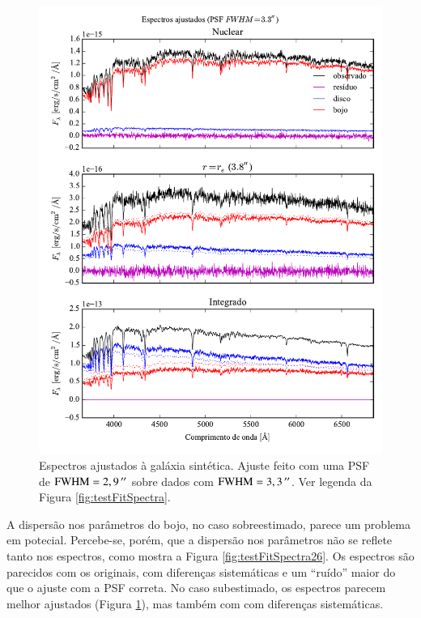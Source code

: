 \begin{figure}
	\includegraphics{figuras/simulation_spectra_psf33}
	\caption[Espectros ajustados (teste com PSF $\mathrm{FWHM} = 3,3\,\arcs$).]
	{Espectros ajustados à galáxia sintética. Ajuste feito com uma PSF de
	$\mathrm{FWHM} = 2,9\,^{\prime\prime}$ sobre dados com $\mathrm{FWHM} = 3,3\,\arcs$. Ver
	legenda da Figura \ref{fig:testFitSpectra}.} \label{fig:testFitSpectra33}
\end{figure}

A dispersão nos parâmetros do bojo, no caso sobreestimado, parece um problema em
potecial. Percebe-se, porém, que a dispersão nos parâmetros não se reflete tanto
nos espectros, como mostra a Figura \ref{fig:testFitSpectra26}. Os espectros são
parecidos com os originais, com diferenças sistemáticas e um ``ruído'' maior do
que o ajuste com a PSF correta. No caso subestimado, os espectros parecem melhor
ajustados (Figura \ref{fig:testFitSpectra33}), mas também com com diferenças
sistemáticas.

